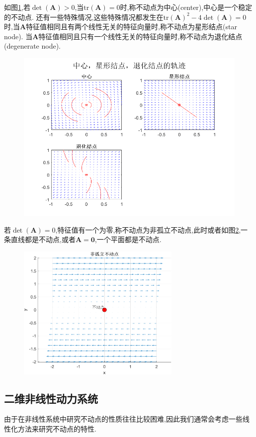 如图\ref{fig:star},若$\det(\mathbf{A})>0$,当$\text{tr}(\mathbf{A})=0$时,称不动点为中心(center),中心是一个稳定的不动点. 还有一些特殊情况,这些特殊情况都发生在$\text{tr}(\mathbf{A})^2-4\det(\mathbf{A})=0$时,当$\mathbf{A}$特征值相同且有两个线性无关的特征向量时,称不动点为星形结点(star node). 当$\mathbf{A}$特征值相同且只有一个线性无关的特征向量时,称不动点为退化结点(degenerate node). 
\begin{figure}[H]
    \centering
    \includegraphics[width=.7\linewidth]{Img/star.png}
    \label{fig:star}
\end{figure}

若$\det(\mathbf{A})=0$,特征值有一个为零,称不动点为非孤立不动点,此时或者如图\ref{fig:nonisolate},一条直线都是不动点,或者$\mathbf{A}=\mathbf{0}$,一个平面都是不动点. 
\begin{figure}[H]
    \centering
    \includegraphics[width=0.7\textwidth]{Img/nonisolate.png}
    \label{fig:nonisolate}
\end{figure}
\subsection{二维非线性动力系统}
由于在非线性系统中研究不动点的性质往往比较困难,因此我们通常会考虑一些线性化方法来研究不动点的特性. 

